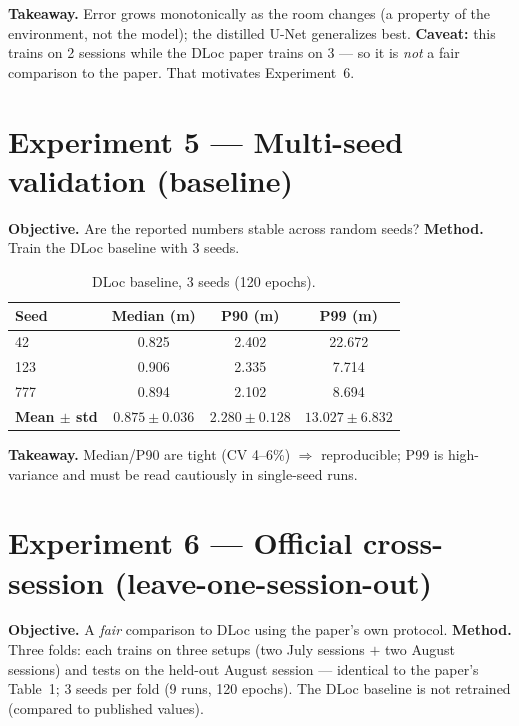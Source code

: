 \documentclass[11pt,a4paper]{article}
\begin{document}
\textbf{Takeaway.} Error grows monotonically as the room changes (a property of the environment,
not the model); the distilled U-Net generalizes best. \textbf{Caveat:} this trains on 2 sessions
while the DLoc paper trains on 3 --- so it is \emph{not} a fair comparison to the paper. That
motivates Experiment~6.

\section{Experiment 5 --- Multi-seed validation (baseline)}

\textbf{Objective.} Are the reported numbers stable across random seeds? \textbf{Method.} Train
the DLoc baseline with 3 seeds.

\begin{table}[H]
\centering
\caption{DLoc baseline, 3 seeds (120 epochs).}
\begin{tabular}{@{}lccc@{}}
\toprule
Seed & Median (m) & P90 (m) & P99 (m) \\
\midrule
42 & 0.825 & 2.402 & 22.672 \\ 123 & 0.906 & 2.335 & 7.714 \\ 777 & 0.894 & 2.102 & 8.694 \\
\midrule
\textbf{Mean $\pm$ std} & $\mathbf{0.875\pm0.036}$ & $\mathbf{2.280\pm0.128}$ & $\mathbf{13.027\pm6.832}$ \\
\bottomrule
\end{tabular}
\end{table}

\textbf{Takeaway.} Median/P90 are tight (CV 4--6\%) $\Rightarrow$ reproducible; P99 is
high-variance and must be read cautiously in single-seed runs.

\section{Experiment 6 --- Official cross-session (leave-one-session-out)}

\textbf{Objective.} A \emph{fair} comparison to DLoc using the paper's own protocol.
\textbf{Method.} Three folds: each trains on three setups (two July sessions $+$ two August
sessions) and tests on the held-out August session --- identical to the paper's Table~1; 3 seeds
per fold (9 runs, 120 epochs). The DLoc baseline is not retrained (compared to published values).
\end{document}
